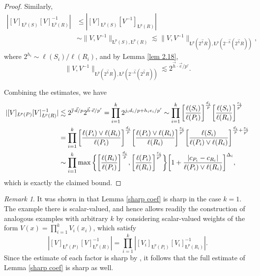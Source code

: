 \documentclass[11pt, reqno]{amsart}
\theoremstyle{definition}
\theoremstyle{remark}
\newtheorem{remark}[theorem]{Remark}
\numberwithin{equation}{section}
\newcommand{\vd}{\vec d}
\newcommand{\ve}{\vec e}
\newcommand{\vh}{\vec h}
\newcommand{\vj}{\vec{\textit{\j}}}
\newcommand{\aveL}{\textit{\L}}
\newcommand{\abs}[1]{|#1|}
\newcommand{\Norm}[2]{\|#1\|_{#2}}
\begin{document}
\begin{proof}
Similarly,
\begin{equation*}
\begin{split}
\abs{ [V]_{\aveL^{p}(S)}[V]_{\aveL^{p}(R)}^{-1}}
&\leq\abs{ [V]_{\aveL^{p}(S)}[V^{-1}]_{\aveL^{p}(R)}} \\
&\sim \Norm{V,V^{-1}}{\aveL^{p}(S),\aveL^{p}(R)}
\lesssim \Norm{V,V^{-1}}{\aveL^{p}(2^{\vh}R),\aveL^{p}(2^{-\vh}(2^{\vh}R))},
\end{split}
\end{equation*}
where $2^{h_i}\sim\ell(S_i)/\ell(R_i)$, and by Lemma \ref{lem 2.18},
\begin{equation*}
\Norm{V,V^{-1}}{\aveL^{p}(2^{\vh}R),\aveL^{p}(2^{-\vh}(2^{\vh}R))}\lesssim 2^{\vh\cdot\ve/p'}.
\end{equation*}

Combining the estimates, we have
\begin{equation*}
\begin{split}
|[V]_{\aveL^{p}(P)}  [V]_{\aveL^{p}(R)}^{-1}|
&\lesssim 2^{\vj\cdot\vd/p}2^{\vh\cdot\ve/p'}
= \prod_{i=1}^k 2^{j_i d_i/p+h_i e_i/p'}
\sim\prod_{i=1}^k \bigg[\frac{\ell(S_i)}{\ell(P_i)}\bigg]^{\frac{d_i}{p}}
\bigg[\frac{\ell(S_i)}{\ell(R_i)}\bigg]^{\frac{e_i}{p'}} \\
&=\prod_{i=1}^k\bigg[\frac{\ell(P_i)\vee\ell(R_i)}{\ell(P_i)}\bigg]^{\frac{d_i}{p}}
\bigg[\frac{\ell(P_i)\vee\ell(R_i)}{\ell(R_i)}\bigg]^{\frac{e_i}{p'}}
\bigg[\frac{\ell(S_i)}{\ell(P_i)\vee\ell(R_i)}\bigg]^{\frac{d_i}{p}+\frac{e_i}{p'}} \\
&\sim\prod_{i=1}^k\max\bigg\{
\bigg[\frac{\ell(R_i)}{\ell(P_i)}\bigg]^{\frac{d_i}{p}},
\bigg[\frac{\ell(P_i)}{\ell(R_i)}\bigg]^{\frac{e_i}{p'}}\bigg\}
\bigg[ 1+\frac{\abs{c_{P_i}-c_{R_i}}}{\ell(P_i)\vee\ell(R_i)}\bigg] ^{\Delta_i},
\end{split}
\end{equation*}
which is exactly the claimed bound.
\end{proof}

\begin{remark}
It was shown in \cite[Lemma 2.47]{BHYY:1a} that Lemma \ref{sharp coef} is sharp in the case $k=1$. The example there is scalar-valued, and hence allows readily the construction of analogous examples with arbitrary $k$ by considering scalar-valued weights of the form $V(x)=\prod_{i=1}^k V_i(x_i)$, which satisfy
\begin{equation*}
\abs{[V]_{\aveL^p(P)}[V]_{\aveL^p(R)}^{-1}}
=\prod_{i=1}^k  \abs{[V_i]_{\aveL^p(P_i)}[V_i]_{\aveL^p(R_i)}^{-1}}.
\end{equation*}
Since the estimate of each factor is sharp by \cite[Lemma 2.47]{BHYY:1a}, it follows that the full estimate of Lemma \ref{sharp coef} is sharp as well.
\end{remark}
\end{document}
